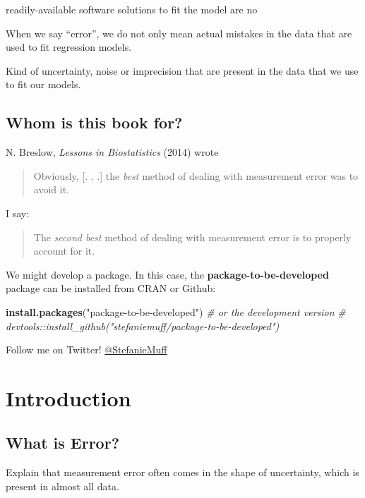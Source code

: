 \documentclass[]{book}
\newenvironment{Shaded}{\begin{snugshade}}{\end{snugshade}}
\newcommand{\KeywordTok}[1]{\textcolor[rgb]{0.13,0.29,0.53}{\textbf{#1}}}
\newcommand{\StringTok}[1]{\textcolor[rgb]{0.31,0.60,0.02}{#1}}
\newcommand{\CommentTok}[1]{\textcolor[rgb]{0.56,0.35,0.01}{\textit{#1}}}
\newcommand{\NormalTok}[1]{#1}
\theoremstyle{definition}
\theoremstyle{definition}
\theoremstyle{definition}
\theoremstyle{remark}
\begin{document}
readily-available software solutions to fit the model are no

When we say ``error'', we do not only mean actual mistakes in the data
that are used to fit regression models.

Kind of uncertainty, noise or imprecision that are present in the data
that we use to fit our models.

\section{Whom is this book for?}\label{whom-is-this-book-for}

N. Breslow, \emph{Lessons in Biostatistics} (2014) \citep{breslow2014}
wrote

\begin{quote}
Obviously, {[}. . .{]} the \emph{best} method of dealing with
measurement error was to avoid it.
\end{quote}

I say:

\begin{quote}
The \emph{second best} method of dealing with measurement error is to
properly account for it.
\end{quote}

We might develop a package. In this case, the
\textbf{package-to-be-developed} package can be installed from CRAN or
Github:

\begin{Shaded}
\begin{Highlighting}[]
\KeywordTok{install.packages}\NormalTok{(}\StringTok{"package-to-be-developed"}\NormalTok{)}
\CommentTok{# or the development version}
\CommentTok{# devtools::install_github("stefaniemuff/package-to-be-developed")}
\end{Highlighting}
\end{Shaded}

Follow me on Twitter!
\href{https://twitter.com/stefaniemuff}{@StefanieMuff}

\chapter{Introduction}\label{intro}

\section{What is Error?}\label{what-is-error}

Explain that measurement error often comes in the shape of uncertainty,
which is present in almost all data.
\end{document}
